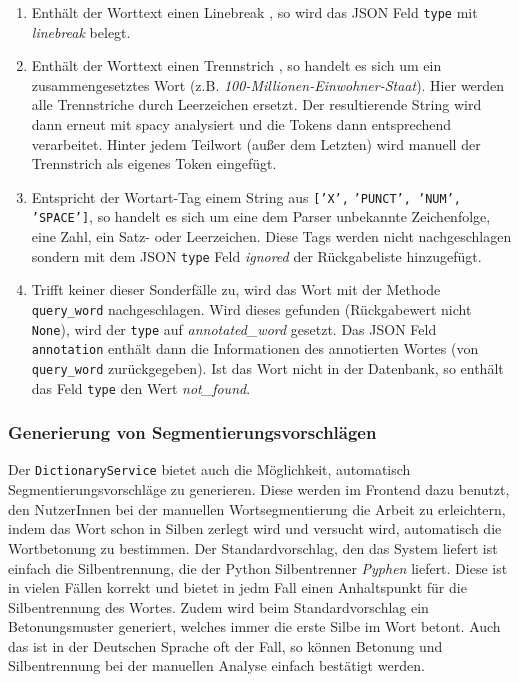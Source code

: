\begin{itemize}
\begin{enumerate}
	\item Enthält der Worttext einen Linebreak , so wird das JSON Feld \texttt{type} mit \textit{linebreak} belegt.
	
	\item Enthält der Worttext einen Trennstrich \qq{\texttt{-}}, so handelt es sich um ein zusammengesetztes Wort (z.B. \textit{100-Millionen-Einwohner-Staat}). Hier werden alle Trennstriche durch Leerzeichen ersetzt. Der resultierende String wird dann erneut mit spacy analysiert und die Tokens dann entsprechend verarbeitet. Hinter jedem Teilwort (außer dem Letzten) wird manuell der Trennstrich als eigenes Token eingefügt.
	
	\item Entspricht der Wortart-Tag einem String aus \texttt{['X',} \texttt{'PUNCT', }\texttt{'NUM', }\\
	\texttt{'SPACE']}, so handelt es sich um eine dem Parser unbekannte Zeichenfolge, eine Zahl, ein Satz- oder Leerzeichen. Diese Tags werden nicht nachgeschlagen sondern mit dem JSON \texttt{type} Feld \textit{ignored} der Rückgabeliste hinzugefügt.
	
	\item Trifft keiner dieser Sonderfälle zu, wird das Wort mit der Methode \texttt{query\_word} nachgeschlagen. Wird dieses gefunden (Rückgabewert nicht \texttt{None}), wird der \texttt{type} auf \textit{annotated\_word} gesetzt. Das JSON Feld \texttt{annotation} enthält dann die Informationen des annotierten Wortes (von \texttt{query\_word} zurückgegeben). Ist das Wort nicht in der Datenbank, so enthält das Feld \texttt{type} den Wert \textit{not\_found}.
\end{enumerate}

\end{itemize}

\subsubsection{Generierung von Segmentierungsvorschlägen}
\label{sec:segmentation-proposals}

Der \texttt{DictionaryService} bietet auch die Möglichkeit, automatisch Segmentierungsvorschläge zu generieren. Diese werden im Frontend dazu benutzt, den NutzerInnen bei der manuellen Wortsegmentierung die Arbeit zu erleichtern, indem das Wort schon in Silben zerlegt wird und versucht wird, automatisch die Wortbetonung zu bestimmen. Der Standardvorschlag, den das System liefert ist einfach die Silbentrennung, die der Python Silbentrenner \textit{Pyphen} liefert. Diese ist in vielen Fällen korrekt und bietet in jedm Fall einen Anhaltspunkt für die Silbentrennung des Wortes. Zudem wird beim Standardvorschlag ein Betonungsmuster generiert, welches immer die erste Silbe im Wort betont. Auch das ist in der Deutschen Sprache oft der Fall, so können Betonung und Silbentrennung bei der manuellen Analyse einfach bestätigt werden.\\

